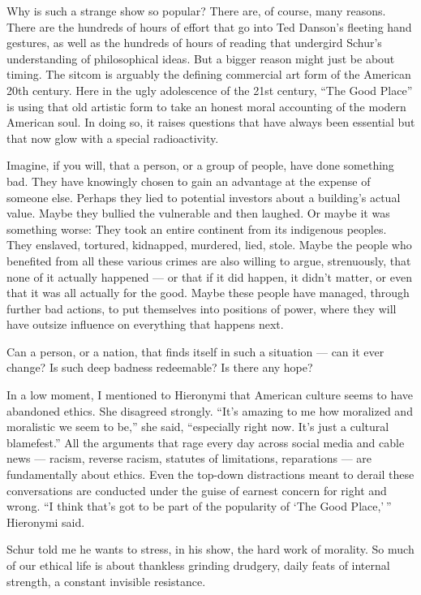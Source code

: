 Why is such a strange show so popular? There are, of course, many
reasons. There are the hundreds of hours of effort that go into Ted
Danson's fleeting hand gestures, as well as the hundreds of hours of
reading that undergird Schur's understanding of philosophical ideas. But
a bigger reason might just be about timing. The sitcom is arguably the
defining commercial art form of the American 20th century. Here in the
ugly adolescence of the 21st century, ``The Good Place'' is using that
old artistic form to take an honest moral accounting of the modern
American soul. In doing so, it raises questions that have always been
essential but that now glow with a special radioactivity.

Imagine, if you will, that a person, or a group of people, have done
something bad. They have knowingly chosen to gain an advantage at the
expense of someone else. Perhaps they lied to potential investors about
a building's actual value. Maybe they bullied the vulnerable and then
laughed. Or maybe it was something worse: They took an entire continent
from its indigenous peoples. They enslaved, tortured, kidnapped,
murdered, lied, stole. Maybe the people who benefited from all these
various crimes are also willing to argue, strenuously, that none of it
actually happened --- or that if it did happen, it didn't matter, or
even that it was all actually for the good. Maybe these people have
managed, through further bad actions, to put themselves into positions
of power, where they will have outsize influence on everything that
happens next.

Can a person, or a nation, that finds itself in such a situation --- can
it ever change? Is such deep badness redeemable? Is there any hope?

In a low moment, I mentioned to Hieronymi that American culture seems to
have abandoned ethics. She disagreed strongly. ``It's amazing to me how
moralized and moralistic we seem to be,'' she said, ``especially right
now. It's just a cultural blamefest.'' All the arguments that rage every
day across social media and cable news --- racism, reverse racism,
statutes of limitations, reparations --- are fundamentally about ethics.
Even the top-down distractions meant to derail these conversations are
conducted under the guise of earnest concern for right and wrong. ``I
think that's got to be part of the popularity of `The Good Place,' ''
Hieronymi said.

Schur told me he wants to stress, in his show, the hard work of
morality. So much of our ethical life is about thankless grinding
drudgery, daily feats of internal strength, a constant invisible
resistance.

